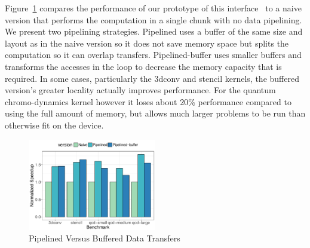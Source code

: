 Figure~\ref{fig:pipeline-perf} compares the performance of our prototype
of this interface~\cite{cui2017directive} to a naive version that performs
the computation in a single chunk with no data pipelining. We present two 
pipelining strategies. Pipelined uses a buffer of the same size and layout 
as in the naive version so it does not save memory space but splits the 
computation so it can overlap transfers. Pipelined-buffer uses smaller buffers
and transforms the accesses in the loop to decrease the memory capacity that
is required. In some cases, particularly the 3dconv and stencil kernels, the 
buffered version's greater locality actually improves performance. For the 
quantum chromo-dynamics kernel however it loses about 20\% performance 
compared to using the full amount of memory, but allows much larger 
problems to be run than otherwise fit on the device.

\begin{figure}
  \centering
  \includegraphics[width=0.5\textwidth]{pics/pipelining-perf}
  \caption{Pipelined Versus Buffered Data Transfers\label{fig:pipeline-perf}}
\end{figure}

